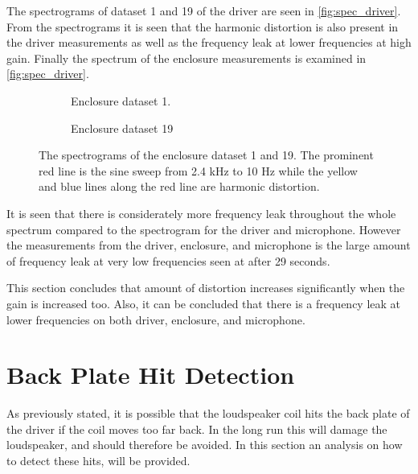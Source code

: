 The spectrograms of dataset 1 and 19 of the driver are seen in \autoref{fig:spec_driver}. From the spectrograms it is seen that the harmonic distortion is also present in the driver measurements as well as the frequency leak at lower frequencies at high gain. Finally the spectrum of the enclosure measurements is examined in \autoref{fig:spec_driver}.

\begin{figure}[H]
\centering
\begin{subfigure}[t]{0.47\textwidth}
	
	\caption{Enclosure dataset 1.}
	\label{fig:spectrogram_enclosure1}
\end{subfigure}
\begin{subfigure}[t]{0.47\textwidth}
	
	\caption{Enclosure dataset 19}
	\label{fig:spectrogram_enclosure19}
\end{subfigure}
\caption{The spectrograms of the enclosure dataset 1 and 19. The prominent red line is the sine sweep from 2.4 kHz to 10 Hz while the yellow and blue lines along the red line are harmonic distortion.}
\label{fig:spec_enclosure}
\end{figure} 

It is seen that there is considerately more frequency leak throughout the whole spectrum compared to the spectrogram for the driver and microphone. However the measurements from the driver, enclosure, and microphone is the large amount of frequency leak at very low frequencies seen at after 29 seconds.

This section concludes that amount of distortion increases significantly when the gain is increased too. Also, it can be concluded that there is a frequency leak at lower frequencies on both driver, enclosure, and microphone. 



\section{Back Plate Hit Detection}\label{sec:hit_detect}

As previously stated, it is possible that the loudspeaker coil hits the back plate of the driver if the coil moves too far back. In the long run this will damage the loudspeaker, and should therefore be avoided. In this section an analysis on how to detect these hits, will be provided. 

